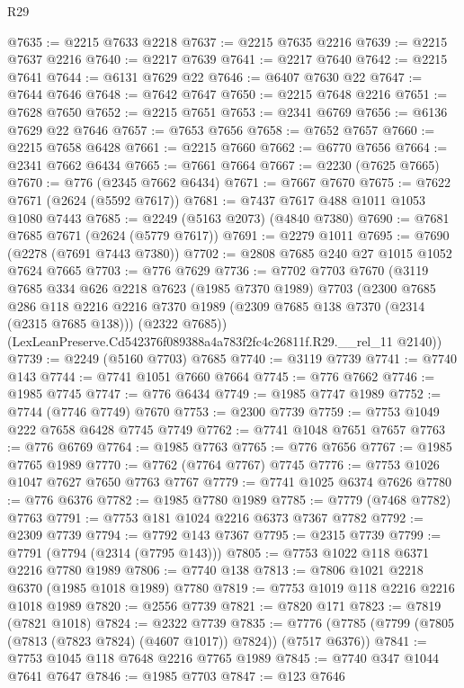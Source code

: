 \begin{lexlean}{R29}
\begin{coremodule}
@7635 := @2215 @7633 @2218
@7637 := @2215 @7635 @2216
@7639 := @2215 @7637 @2216
@7640 := @2217 @7639
@7641 := @2217 @7640
@7642 := @2215 @7641
@7644 := @6131 @7629 @22
@7646 := @6407 @7630 @22
@7647 := @7644 @7646
@7648 := @7642 @7647
@7650 := @2215 @7648 @2216
@7651 := @7628 @7650
@7652 := @2215 @7651
@7653 := @2341 @6769
@7656 := @6136 @7629 @22 @7646
@7657 := @7653 @7656
@7658 := @7652 @7657
@7660 := @2215 @7658 @6428
@7661 := @2215 @7660
@7662 := @6770 @7656
@7664 := @2341 @7662 @6434
@7665 := @7661 @7664
@7667 := @2230 (@7625 @7665)
@7670 := @776 (@2345 @7662 @6434)
@7671 := @7667 @7670
@7675 := @7622 @7671 (@2624 (@5592 @7617))
@7681 := @7437 @7617 @488 @1011 @1053 @1080 @7443
@7685 := @2249 (@5163 @2073) (@4840 @7380)
@7690 := @7681 @7685 @7671 (@2624 (@5779 @7617))
@7691 := @2279 @1011
@7695 := @7690 (@2278 (@7691 @7443 @7380))
@7702 := @2808 @7685 @240 @27 @1015 @1052 @7624 @7665
@7703 := @776 @7629
@7736 := @7702
    @7703
    @7670
    (@3119
      @7685
      @334
      @626
      @2218
      @7623
      (@1985 @7370 @1989)
      @7703
      (@2300
        @7685
        @286
        @118
        @2216
        @2216
        @7370
        @1989
        (@2309 @7685 @138 @7370 (@2314 (@2315 @7685 @138)))
        (@2322 @7685))
      (LexLeanPreserve.Cd542376f089388a4a783f2fc4c26811f.R29.__rel_11 @2140))
@7739 := @2249 (@5160 @7703) @7685
@7740 := @3119 @7739
@7741 := @7740 @143
@7744 := @7741 @1051 @7660 @7664
@7745 := @776 @7662
@7746 := @1985 @7745
@7747 := @776 @6434
@7749 := @1985 @7747 @1989
@7752 := @7744 (@7746 @7749) @7670
@7753 := @2300 @7739
@7759 := @7753 @1049 @222 @7658 @6428 @7745 @7749
@7762 := @7741 @1048 @7651 @7657
@7763 := @776 @6769
@7764 := @1985 @7763
@7765 := @776 @7656
@7767 := @1985 @7765 @1989
@7770 := @7762 (@7764 @7767) @7745
@7776 := @7753 @1026 @1047 @7627 @7650 @7763 @7767
@7779 := @7741 @1025 @6374 @7626
@7780 := @776 @6376
@7782 := @1985 @7780 @1989
@7785 := @7779 (@7468 @7782) @7763
@7791 := @7753 @181 @1024 @2216 @6373 @7367 @7782
@7792 := @2309 @7739
@7794 := @7792 @143 @7367
@7795 := @2315 @7739
@7799 := @7791 (@7794 (@2314 (@7795 @143)))
@7805 := @7753 @1022 @118 @6371 @2216 @7780 @1989
@7806 := @7740 @138
@7813 := @7806 @1021 @2218 @6370 (@1985 @1018 @1989) @7780
@7819 := @7753 @1019 @118 @2216 @2216 @1018 @1989
@7820 := @2556 @7739
@7821 := @7820 @171
@7823 := @7819 (@7821 @1018)
@7824 := @2322 @7739
@7835 := @7776 (@7785 (@7799 (@7805 (@7813 (@7823 @7824) (@4607 @1017)) @7824)) (@7517 @6376))
@7841 := @7753 @1045 @118 @7648 @2216 @7765 @1989
@7845 := @7740 @347 @1044 @7641 @7647
@7846 := @1985 @7703
@7847 := @123 @7646

\end{coremodule}
\end{lexlean}
